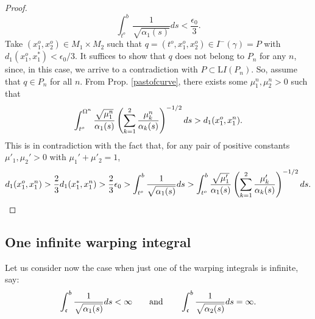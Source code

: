 \begin{proof}
  \[
\int_{t^o}^{b}\frac{1}{\sqrt{\alpha_1(s)}}ds<\frac{\epsilon_0}{3}.
    \]
    Take $(x_1^o,x_2^o)\in M_1\times M_2$ such that $q=(t^o,x_1^o,x_2^o)\in I^-(\gamma)=P$ with $d_1(x_1^o,x_1^*)<\epsilon_0/3$. It suffices to show that $q$ does not belong to $P_n$ for any $n$, since, in this case, we arrive to a contradiction with $P\subset {\mathrm LI}(P_n)$.  So, assume that $q\in P_n$ for all $n$. From  Prop. \ref{pastofcurve}, there exists some $\mu^n_1,\mu^n_2>0$ such that
    \[
\int_{t^{o}}^{\Omega^n} \frac{\sqrt{\mu^n_{1}}}{\alpha_{1}(s)}\left(\sum_{k=1}^{2} \frac{\mu^n_{k}}{\alpha_{k}(s)} \right)^{-1/2}ds >
d_{1}(x^{o}_{1},x^{n}_{1}).
      \]
      This is in contradiction with the fact that, for any pair of positive constants $\mu'_1,\mu_2'>0$ with $\mu_1'+\mu'_2=1$,
      \[
d_1(x^o_1,x^n_1)>\frac{2}{3} d_1(x^*_1,x^n_1)> \frac{2}{3}\epsilon_0>\int_{t^o}^{b}\frac{1}{\sqrt{\alpha_1(s)}}ds>\int_{t^{o}}^{b} \frac{\sqrt{\mu'_{1}}}{\alpha_{1}(s)}\left(\sum_{k=1}^{2} \frac{\mu'_{k}}{\alpha_{k}(s)} \right)^{-1/2}ds.
        \]
\end{proof}

\subsection{One infinite warping integral}

Let us consider now the case when just one of the warping integrals is infinite, say:
\begin{equation}
  \label{eq:9}
 \int_{\mathfrak{c}}^{b}\frac{1}{\sqrt{\alpha_1(s)}}ds<\infty \qquad \hbox{and}\qquad \int_{\mathfrak{c}}^{b}\frac{1}{\sqrt{\alpha_2(s)}}ds=\infty.
\end{equation}


